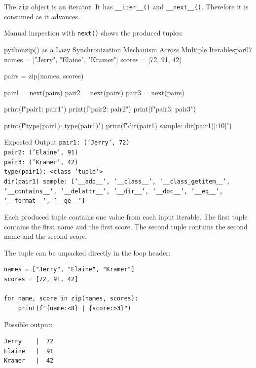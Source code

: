 The \texttt{zip} object is an iterator. It has \texttt{\_\_iter\_\_()} and \texttt{\_\_next\_\_()}. Therefore it is consumed as it advances.

Manual inspection with \texttt{next()} shows the produced tuples:

\begin{codebox}[]{python}{zip() as a Lazy Synchronization Mechanism Across Multiple Iterables}{par07}
names = ["Jerry", "Elaine", "Kramer"]
scores = [72, 91, 42]

pairs = zip(names, scores)

pair1 = next(pairs)
pair2 = next(pairs)
pair3 = next(pairs)

print(f"pair1: {pair1}")
print(f"pair2: {pair2}")
print(f"pair3: {pair3}")

print(f"type(pair1): {type(pair1)}")
print(f"dir(pair1) sample: {dir(pair1)[:10]}")
\end{codebox}


\begin{iobox}{Expected Output}
\texttt{pair1: ('Jerry', 72)} \\
\texttt{pair2: ('Elaine', 91)} \\
\texttt{pair3: ('Kramer', 42)} \\
\texttt{type(pair1): <class 'tuple'>} \\
\texttt{dir(pair1) sample: ['\_\_add\_\_', '\_\_class\_\_', '\_\_class\_getitem\_\_',} \\
\texttt{'\_\_contains\_\_', '\_\_delattr\_\_', '\_\_dir\_\_', '\_\_doc\_\_', '\_\_eq\_\_',} \\
\texttt{'\_\_format\_\_', '\_\_ge\_\_']} \\
\end{iobox}


Each produced tuple contains one value from each input iterable. The first tuple contains the first name and the first score. The second tuple contains the second name and the second score.

The tuple can be unpacked directly in the loop header:

\begin{verbatim}
names = ["Jerry", "Elaine", "Kramer"]
scores = [72, 91, 42]

for name, score in zip(names, scores):
    print(f"{name:<8} | {score:>3}")
\end{verbatim}

Possible output:

\begin{verbatim}
Jerry    |  72
Elaine   |  91
Kramer   |  42
\end{verbatim}

